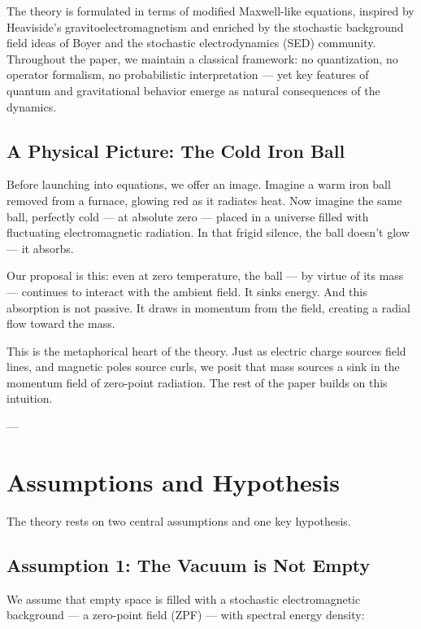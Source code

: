 \documentclass {article}
\begin{document}
The theory is formulated in terms of modified Maxwell-like equations, inspired by Heaviside’s gravitoelectromagnetism and enriched by the stochastic background field ideas of Boyer and the stochastic electrodynamics (SED) community. Throughout the paper, we maintain a classical framework: no quantization, no operator formalism, no probabilistic interpretation — yet key features of quantum and gravitational behavior emerge as natural consequences of the dynamics.

\vspace{10pt}
\subsection{A Physical Picture: The Cold Iron Ball}

Before launching into equations, we offer an image. Imagine a warm iron ball removed from a furnace, glowing red as it radiates heat. Now imagine the same ball, perfectly cold — at absolute zero — placed in a universe filled with fluctuating electromagnetic radiation. In that frigid silence, the ball doesn’t glow — it absorbs.

Our proposal is this: even at zero temperature, the ball — by virtue of its mass — continues to interact with the ambient field. It sinks energy. And this absorption is not passive. It draws in momentum from the field, creating a radial flow toward the mass.

This is the metaphorical heart of the theory. Just as electric charge sources field lines, and magnetic poles source curls, we posit that mass sources a sink in the momentum field of zero-point radiation. The rest of the paper builds on this intuition.

---

\section{Assumptions and Hypothesis}

The theory rests on two central assumptions and one key hypothesis.

\subsection{Assumption 1: The Vacuum is Not Empty}

We assume that empty space is filled with a stochastic electromagnetic background — a zero-point field (ZPF) — with spectral energy density:
\end{document}
